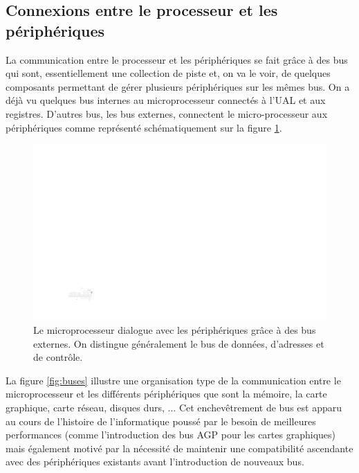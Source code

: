\subsection{Connexions entre le processeur et les périphériques}

La communication entre le processeur et les périphériques se fait grâce à des bus qui sont, essentiellement une collection de piste et, on va le voir, de quelques composants permettant de gérer plusieurs périphériques sur les mêmes bus. On a déjà vu quelques bus internes au microprocesseur connectés à l'UAL et aux registres. D'autres bus, les bus externes, connectent le micro-processeur aux périphériques comme représenté schématiquement sur la figure \ref{fig:chemin_peripherique}.

\begin{figure}[htbp]
\includegraphics[width=\linewidth]{Figs/chemin_peripherique.pdf}
\caption{\label{fig:chemin_peripherique} Le microprocesseur dialogue avec les périphériques grâce à des bus externes. On distingue généralement le bus de données, d'adresses et de contrôle.}
\end{figure}

La figure \ref{fig:buses} illustre une organisation type de la communication entre le microprocesseur et les différents périphériques que sont la mémoire, la carte graphique, carte réseau, disques durs, ... Cet enchevêtrement de bus est apparu au cours de l'histoire de l'informatique poussé par le besoin de meilleures performances (comme l'introduction des bus AGP pour les cartes graphiques) mais également motivé par la nécessité de maintenir une compatibilité ascendante avec des périphériques existants avant l'introduction de nouveaux bus. 

